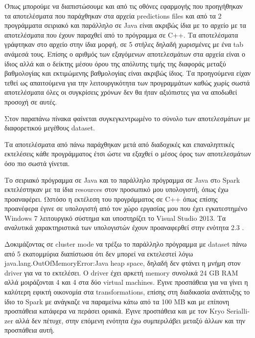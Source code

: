 \documentclass{report}
\begin{document}
{\vspace{3mm} 

Όπως μπορούμε να διαπιστώσουμε και από τις οθόνες εφαρμογής που προηγήθηκαν τα αποτελέσματα που παράχθηκαν στα αρχεία \textlatin{predictions files} και από τα 2 προγράμματα σειριακό και παράλληλο σε \textlatin{Java} είναι ακριβώς ίδια με το αρχείο με τα αποτελέσματα που έχουν παραχθεί από το πρόγραμμα σε \textlatin{C++}. Τα αποτελέσματα γράφτηκαν στο αρχείο στην ίδια μορφή, σε 5 στήλες δηλαδή χωρισμένες με ένα \textlatin{tab} ανάμεσά τους. Επίσης ο αριθμός των εξαγόμενων αποτελεσμάτων στα αρχεία είναι ο ίδιος αλλά και ο δείκτης μέσου όρου της απόλυτης τιμής της διαφοράς μεταξύ βαθμολογίας και εκτιμώμενης βαθμολογίας είναι ακριβώς ίδιος. Τα προηγούμενα είχαν τεθεί ως απαιτούμενα για την λειτουργικότητα των προγραμμάτων καθώς χωρίς σωστά αποτελέσματα όλες οι συγκρίσεις χρόνων δεν θα ήταν αξιόπιστες για να αποδωθεί προσοχή σε αυτές.

Στον παραπάνω πίνακα φαίνεται συγκεγκεντρωμένο το σύνολο των αποτελεσμάτων με διαφορετικού μεγέθους \textlatin{dataset}.


Τα αποτελέσματα από πάνω παράχθηκαν μετά από διαδοχικές και επαναληπτικές εκτελέσεις κάθε προγράμματος έτσι ώστε να εξαχθεί ο μέσος όρος των αποτελεσμάτων όσο πιο σωστά γίνεται.

Το σειριακό πρόγραμμα σε \textlatin{Java} και το παράλληλο πρόγραμμα σε \textlatin{Java} στo \textlatin{Spark} εκτελέστηκαν με τα ίδια \textlatin{resources} στον προσωπικό μου υπολογιστή, όπως έχω προαναφέρει. Ωστόσο η εκτέλεση του προγράμματος σε \textlatin{C++} όπως επίσης προανέφερα έγινε σε υπολογιστή από τον χώρο εργασίας μου που έχει εγκατεστημένο \textlatin{Windows 7} λειτουργικό σύστημα και υποστηρίζει το \textlatin{Visual Studio 2013}. Τα αναλυτικά χαρακτηριστικά των υπολογιστών έχουν προαναφερθεί στην ενότητα 2.3 . 

Δοκιμάζοντας σε \textlatin{cluster mode} να τρέξω το παράλληλο πρόγραμμα με \textlatin{dataset} πάνω από 5 εκατομμύρια διαπίστωσα ότι δεν μπορεί να εκτελεστεί λόγω \textlatin{java.lang.OutOfMemoryError:Java heap space}, δηλαδή δεν φτάνει η μνήμη στον \textlatin{driver} για να το εκτελέσει. Ο \textlatin{driver} έχει αρκετή \textlatin{memory} συνολικά 24 \textlatin{GB RAM} αλλά μοιράζονται 4 και 4 στα δύο \textlatin{virtual machines}. Έγινε προσπάθεια για να γίνει η καλύτερη εφικτή οικονομία στα \textlatin{transformations}, επίσης στη διαδικασία ανάπτυξης το ίδιο το \textlatin{Spark} με ανάγκαζε να παραμείνω κάτω από τα 100 \textlatin{MB} και με επίπονη προσπάθεια κατάφερα να περάσει οριακά. Έγινε προσπάθεια και με τον \textlatin{Kryo Seriallizer} αλλά δεν πέτυχε, στην επόμενη ενότητα έχω συμπεριλάβει μεταξύ άλλων και την προσπάθεια αυτή.    

}
\end{document}
